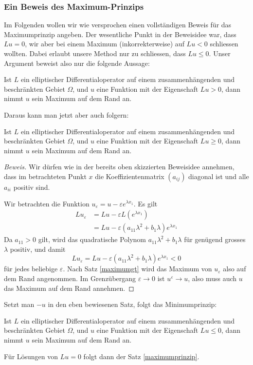 {\small
\subsubsection{Ein Beweis des Maximum-Prinzips}
Im Folgenden wollen wir wie versprochen einen vollständigen Beweis für das
Maximumprinzip angeben. Der wesentliche Punkt in der Beweisidee
war, dass $Lu=0$, wir aber bei einem Maximum (inkorrekterweise)
auf $Lu<0$ schliessen wollten. Dabei erlaubt unsere Method nur zu
schliessen, dass $Lu\le 0$.
Unser Argument beweist also nur die folgende Aussage:
\begin{satz}
\label{maximumgt}
Ist $L$ ein elliptischer Differentialoperator auf einem zusammenhängenden
und beschränkten Gebiet $\Omega$,
und $u$ eine Funktion mit der Eigenschaft $Lu>0$,
dann nimmt $u$ sein Maximum auf dem Rand an.
\end{satz}

Daraus kann man jetzt aber auch folgern:
\begin{satz}
Ist $L$ ein elliptischer Differentialoperator auf einem zusammenhängenden
und beschränkten Gebiet $\Omega$,
und $u$ eine Funktion mit der Eigenschaft $Lu\ge0$,
dann nimmt $u$ sein Maximum auf dem Rand an.
\end{satz}

\begin{proof}[Beweis]
Wir dürfen wie in der bereits oben skizzierten Beweisidee annehmen,
dass im betrachteten Punkt $x$ die Koeffizientenmatrix $(a_{ij})$
diagonal ist und alle $a_{ii}$ positiv sind.

Wir betrachten die Funktion $u_{\varepsilon}=u-\varepsilon e^{\lambda x_1}$.
Es gilt
\begin{align*}
Lu_{\varepsilon}&=Lu-\varepsilon L(e^{\lambda x_1})\\
&=Lu-\varepsilon(a_{11}\lambda^2+b_1\lambda)e^{\lambda x_1}
\end{align*}
Da $a_{11}>0$ gilt, wird das quadratische Polynom $a_{11}\lambda^2+b_1\lambda$
für genügend grosses $\lambda$ positiv, und damit 
\[
Lu_{\varepsilon}= Lu-\varepsilon(a_{11}\lambda^2+b_1\lambda)e^{\lambda x_1}<0
\]
für jedes beliebige $\varepsilon$. Nach Satz \ref{maximumgt} wird das Maximum
von $u_\varepsilon$ also auf dem Rand angenommen.
Im Grenzübergang $\varepsilon\to 0$ ist $u^\varepsilon\to u$, also
muss auch $u$ das Maximum auf dem Rand annehmen.
\end{proof}

Setzt man $-u$ in den eben bewiesenen Satz, folgt das Minimumprinzip:
\begin{satz}
Ist $L$ ein elliptischer Differentialoperator auf einem zusammenhängenden
und beschränkten Gebiet $\Omega$,
und $u$ eine Funktion mit der Eigenschaft $Lu\le0$,
dann nimmt $u$ sein Maximum auf dem Rand an.
\end{satz}

Für Lösungen von $Lu=0$ folgt dann der Satz \ref{maximumprinzip}.
}


